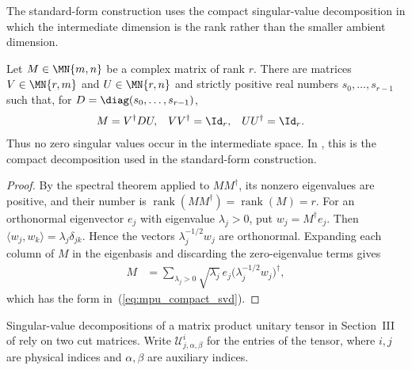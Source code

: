The standard-form construction uses the compact singular-value decomposition in
which the intermediate dimension is the rank rather than the smaller ambient
dimension.

\begin{lemma}
    \label{thm:mpu_compact_svd}
    \leanok
    Let $M\in\MN{m,n}$ be a complex matrix of rank $r$. There are matrices
    $V\in\MN{r,m}$ and $U\in\MN{r,n}$ and strictly positive real numbers
    $s_0,\ldots,s_{r-1}$ such that, for $D=\diag(s_0,\ldots,s_{r-1})$,
    \begin{align}
        M & =V^\dagger D U, & VV^\dagger & =\Id_r, & UU^\dagger & =\Id_r.
        \label{eq:mpu_compact_svd}
    \end{align}
    Thus no zero singular values occur in the intermediate space. In \cite[Section~III]{Cirac2017MPU}, this is the
    compact decomposition used in the standard-form
    construction.
\end{lemma}

\begin{proof}\leanok
    By the spectral theorem applied to $MM^\dagger$, its nonzero eigenvalues are
    positive, and their number is
    $\operatorname{rank}(MM^\dagger)=\operatorname{rank}(M)=r$. For an
    orthonormal eigenvector $e_j$ with eigenvalue $\lambda_j>0$, put
    $w_j=M^\dagger e_j$. Then
    $\langle w_j,w_k\rangle=\lambda_j\delta_{jk}$. Hence the vectors
    $\lambda_j^{-1/2}w_j$ are orthonormal. Expanding each column of $M$ in the
    eigenbasis and discarding the zero-eigenvalue terms gives
    \begin{align}
        M & =\sum_{\lambda_j>0}
        \sqrt{\lambda_j}\,e_j
        \bigl(\lambda_j^{-1/2}w_j\bigr)^\dagger,
    \end{align}
    which has the form in~(\ref{eq:mpu_compact_svd}).
\end{proof}

Singular-value decompositions of a matrix product unitary tensor in
Section~III of \cite{Cirac2017MPU} rely on two cut matrices. Write
$\mathcal U^i_{j,\alpha,\beta}$ for the entries of the tensor, where $i,j$ are
physical indices and $\alpha,\beta$ are auxiliary indices.


